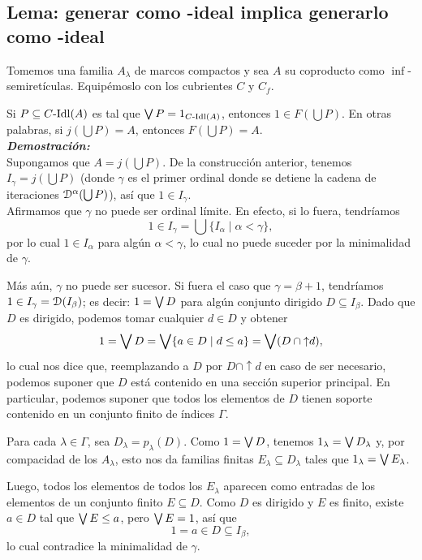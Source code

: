 \subsection{Lema: generar como -ideal implica generarlo como -ideal}
    Tomemos una familia $A_\lambda$ de marcos compactos
    y sea $A$ su coproducto como $\inf$-semiretículas.
    Equipémoslo con los cubrientes $C$ y $C_f$.
    
    Si $P\subseteq C\text{-}\mathrm{Idl}(A)$ es tal que $\bigvee P=1_{C\text{-}\mathrm{Idl}(A)}$,
    entonces $1\in F(\bigcup P)$.
    En otras palabras, si
    $j(\bigcup P)=A$, entonces $F(\bigcup P)=A$.
    \\
    \textbf{\emph{Demostración:}} \\
    Supongamos que $A=j(\bigcup P)$.
    De la construcción anterior, tenemos
    $I_\gamma=j(\bigcup P)$ (donde $\gamma$ es el primer
    ordinal donde se detiene la cadena de iteraciones
    $\mathcal D^\alpha(\bigcup P)$),
    así que $1\in I_\gamma$. \\
    Afirmamos que $\gamma$ no puede ser ordinal límite.
    En efecto, si lo fuera, tendríamos
    \[
        1 \in I_\gamma = \bigcup\{I_\alpha \mid \alpha<\gamma\}
    ,\]
    por lo cual $1\in I_\alpha$ para algún $\alpha<\gamma$, lo
    cual no puede suceder por la minimalidad de $\gamma$.

    Más aún, $\gamma$ no puede ser sucesor.
    Si fuera el caso que $\gamma=\beta+1$, tendríamos
    $1\in I_\gamma = \mathcal D(I_\beta)$;
    es decir: $1=\bigvee D$ para algún conjunto dirigido
    $D\subseteq I_\beta$.
    Dado que $D$ es dirigido, podemos tomar cualquier
    $d\in D$ y obtener
    \[
        1
        = \bigvee D
        = \bigvee\{a\in D\mid d\leq a\}
        = \bigvee(D\cap{\uparrow}d)
    ,\]
    lo cual nos dice que,
    reemplazando a $D$ por $D\cap{\uparrow}d$ en
    caso de ser necesario,
    podemos suponer que $D$ está contenido en una
    sección superior principal.
    En particular, podemos suponer que todos los elementos
    de $D$ tienen soporte contenido en
    un conjunto finito de índices $\Gamma$.

    Para cada $\lambda\in\Gamma$, sea $D_\lambda=p_\lambda(D)$.
    Como $1=\bigvee D$, tenemos $1_\lambda=\bigvee D_\lambda$ y,
    por compacidad de los $A_\lambda$, esto nos da familias finitas
    $E_\lambda\subseteq D_\lambda$ tales que
    $1_\lambda=\bigvee E_\lambda$.
    
    Luego, todos los elementos de todos los $E_\lambda$ aparecen
    como entradas de los elementos de un conjunto finito
    $E\subseteq D$.
    Como $D$ es dirigido y $E$ es finito,
    existe $a\in D$ tal que $\bigvee E\leq a$,
    pero $\bigvee E=1$, así que
    \[
        1 = a \in D\subseteq I_\beta
    ,\]
    lo cual contradice la minimalidad de $\gamma$.
    

